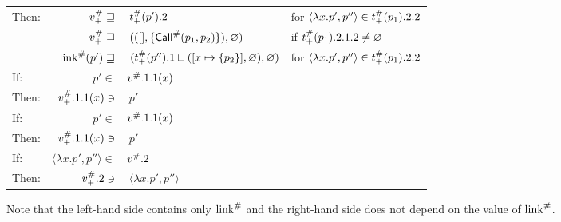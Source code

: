 \documentclass{article}
\begin{document}
\begin{center}
\begin{tabular}{|l@{\hskip2pt}r@{\hskip2pt}l@{\hskip2pt}l|}
		Then:           & ${v}^{\#}_+\sqsupseteq$                           & $\:{t}^{\#}_+(p').2$                                                              & for $\langle\lambda x.p',p''\rangle\in{t}^{\#}_+(p_1).2.2$ \\
		                & ${v}^{\#}_+\sqsupseteq$                           & $\:(([],\{{\textsf{Call}}^{\#}(p_1,p_2)\}),\varnothing)$                                      & if ${t}^{\#}_+(p_1).2.1.2\neq\varnothing$                  \\
		                & ${\text{link}}^{\#}(p')\sqsupseteq$                       & $\:({t}^{\#}_+(p'').1\sqcup([x\mapsto\{p_2\}],\varnothing),\varnothing)$          & for $\langle\lambda x.p',p''\rangle\in{t}^{\#}_+(p_1).2.2$ \\
		\hline
		If:             & $p'\in$                                          & ${v}^{\#}.1.1(x)$                                                                    &                                                              \\
		Then:           & ${v}^{\#}_+.1.1(x)\ni$                            & $\:p'$                                                                              &                                                              \\
		\hline
		If:             & $p'\in$                                          & ${v}^{\#}.1.1(x)$                                                                    &                                                              \\
		Then:           & ${v}^{\#}_+.1.1(x)\ni$                            & $\:p'$                                                                              &                                                              \\
		\hline
		If:             & $\langle\lambda x.p',p''\rangle\in$              & ${v}^{\#}.2$                                                                         &                                                              \\
		Then:           & ${v}^{\#}_+.2\ni$                                 & $\:\langle\lambda x.p',p''\rangle$                                                  &                                                              \\
		\hline
	\end{tabular}
\end{center}
Note that the left-hand side contains only ${\text{link}}^{\#}$ and the right-hand side does not depend on the value of ${\text{link}}^{\#}$.
\end{document}
